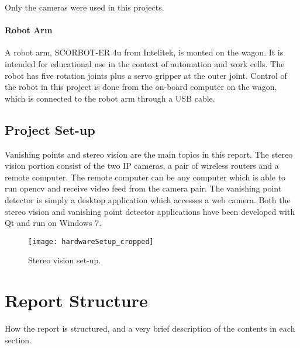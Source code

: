Only the cameras were used in this projects. 

\paragraph{Robot Arm}

A robot arm, SCORBOT-ER 4u from Intelitek, is monted on the wagon. It is intended for educational use in the context of automation and work cells. The robot has five rotation joints plus a servo gripper at the outer joint. Control of the robot in this project is done from the on-board computer on the wagon, which is connected to the robot arm through a USB cable. 


\subsection{Project Set-up}

Vanishing points and stereo vision are the main topics in this report. The stereo vision portion consist of the two IP cameras, a pair of wireless routers and a remote computer. The remote computer can be any computer which is able to run \gls{opencv} and receive video feed from the camera pair. The vanishing point detector is simply a desktop application which accesses a web camera. Both the stereo vision and vanishing point detector applications have been developed with Qt and run on Windows 7.

\begin{figure}
	\texttt{[image: hardwareSetup\_cropped]}
	\caption{\label{fig:hardware}Stereo vision set-up.}
\end{figure}

\section{Report Structure}
How the report is structured, and a very brief description of the contents in each section.